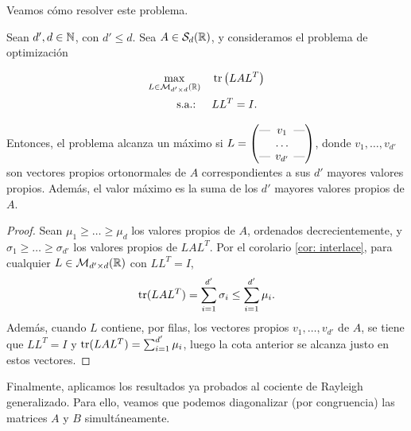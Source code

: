 Veamos cómo resolver este problema.

\begin{thm} \label{thm:eigen_trace_opt}
    Sean $d',d \in \mathbb{N} $, con $d' \le d$. Sea $A \in \mathcal{S}_d(\mathbb{R})$, y consideramos el problema de optimización
    
    \begin{equation}
    \begin{split}
        \max_{L \in \mathcal{M}_{d'\times d}(\mathbb{R})} &\quad \operatorname{tr}\left(LAL^T\right)  \\
        \text{s.a.: } &\quad LL^T = I.
    \end{split}
    \end{equation}
    
    Entonces, el problema alcanza un máximo si $L = \begin{pmatrix}
    \text{---} \hspace{-0.2cm} & v_1 & \hspace{-0.2cm} \text{---} \\
    & \dots &  \\
    \text{---} \hspace{-0.2cm} & v_{d'} & \hspace{-0.2cm} \text{---}
    \end{pmatrix}$, donde $v_1,\dots,v_{d'}$ son vectores propios ortonormales de $A$ correspondientes a sus $d'$ mayores valores propios. Además, el valor máximo es la suma de los $d'$ mayores valores propios de $A$.
    
    
\end{thm}

\begin{proof}
    Sean $\mu_1 \ge \dots \ge \mu_d$ los valores propios de $A$, ordenados decrecientemente, y $\sigma_1 \ge \dots \ge \sigma_{d'}$ los valores propios de $LAL^T$. Por el corolario \ref{cor: interlace}, para cualquier $L \in \mathcal{M}_{d' \times d}(\mathbb{R})$ con $LL^T = I$,
    \[ \operatorname{tr}(LAL^T) = \sum_{i=1}^{d'} \sigma_i \le \sum_{i=1}^{d'} \mu_i. \]
    Además, cuando $L$ contiene, por filas, los vectores propios $v_1,\dots,v_{d'}$ de $A$, se tiene que $LL^T = I$ y $\operatorname{tr}(LAL^T) = \sum_{i=1}^{d'}\mu_i$, luego la cota anterior se alcanza justo en estos vectores.
\end{proof}

Finalmente, aplicamos los resultados ya probados al cociente de Rayleigh generalizado. Para ello, veamos que podemos diagonalizar (por congruencia) las matrices $A$ y $B$ simultáneamente.

